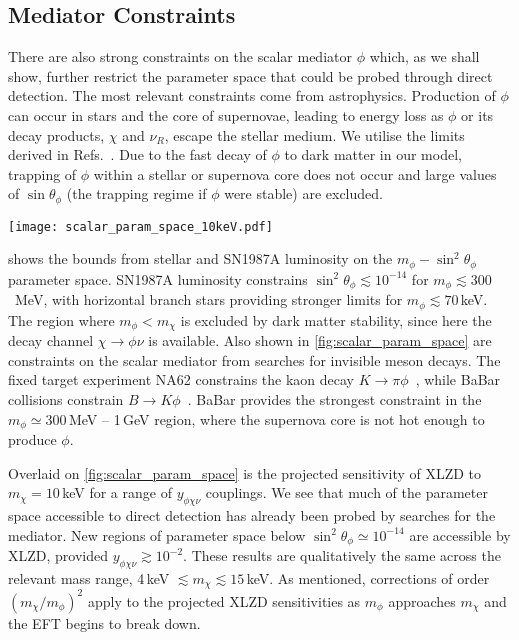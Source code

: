 \documentclass[aps, prd, reprint, nofootinbib, amsmath, amssymb, floatfix]{revtex4-2}
\begin{document}

\subsection{Mediator Constraints}

There are also strong constraints on the scalar mediator $\phi$ which, as we shall show, further restrict the parameter space that could be probed through direct detection. The most relevant constraints come from astrophysics. Production of $\phi$ can occur in stars and the core of supernovae, leading to energy loss as $\phi$ or its decay products, $\chi$ and $\nu_R$, escape the stellar medium. We utilise the limits derived in Refs.~\cite{Dev:2020eam, Yamamoto:2023zlu}. Due to the fast decay of $\phi$ to dark matter in our model, trapping of $\phi$ within a stellar or supernova core does not occur and large values of $\sin\theta_\phi$ (the trapping regime if $\phi$ were stable) are excluded.

\begin{figure*}
    \texttt{[image: scalar\_param\_space\_10keV.pdf]}
    \caption{\label{fig:scalar_param_space} Projected direct detection sensitivity of XLZD for various values of $y_{\phi\chi\nu}$. The shaded regions are excluded by astrophysical constraints (blue), meson decays (green), and dark matter stability (black). The results are shown for $\cos\theta_R= 1$ and $m_\chi=10$\,keV.}
\end{figure*}

 shows the bounds from stellar and SN1987A luminosity on the $m_\phi - \sin^2\theta_\phi$ parameter space. SN1987A luminosity constrains $\sin^2\theta_\phi \lesssim 10^{-14}$ for $m_\phi \lesssim 300$~MeV, with horizontal branch stars providing stronger limits for $m_\phi \lesssim 70$\,keV. The region where $m_\phi < m_\chi$ is excluded by dark matter stability, since here the decay channel $\chi\to\phi\nu$ is available. Also shown in \cref{fig:scalar_param_space} are constraints on the scalar mediator from searches for invisible meson decays. The fixed target experiment NA62 constrains the kaon decay $K\to\pi\phi$~\cite{NA62:2021zjw}, while BaBar collisions constrain $B\to K\phi$~\cite{Anchordoqui:2013bfa}. BaBar provides the strongest constraint in the $m_\phi \simeq 300$\,MeV -- 1\,GeV region, where the supernova core is not hot enough to produce $\phi$.

Overlaid on \cref{fig:scalar_param_space} is the projected sensitivity of XLZD to $m_\chi = 10$\,keV for a range of $y_{\phi\chi\nu}$ couplings. We see that much of the parameter space accessible to direct detection has already been probed by searches for the mediator. New regions of parameter space below $\sin^2\theta_\phi \simeq 10^{-14}$ are accessible by XLZD, provided $y_{\phi\chi\nu} \gtrsim 10^{-2}$. These results are qualitatively the same across the relevant mass range, 4\,keV $\lesssim m_\chi \lesssim 15$\,keV. As mentioned, corrections of order $(m_\chi/m_\phi)^2$ apply to the projected XLZD sensitivities as $m_\phi$ approaches $m_\chi$ and the EFT begins to break down.
\end{document}
